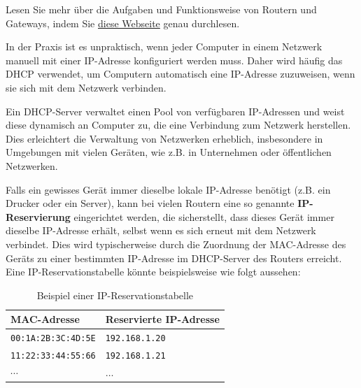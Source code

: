 \begin{mychallenge}
	Lesen Sie mehr über die Aufgaben und Funktionsweise von Routern und Gateways, indem Sie \href{https://inf-schule.de/rechnernetze/filius/vernetzungrechnernetze/konzept_router}{diese Webseite} genau durchlesen.
\end{mychallenge}


\begin{myremark}
	In der Praxis ist es unpraktisch, wenn jeder Computer in einem Netzwerk manuell mit einer \gls{IP}-Adresse konfiguriert werden muss. Daher wird häufig das \acrfull{DHCP} verwendet, um Computern automatisch eine \gls{IP}-Adresse zuzuweisen, wenn sie sich mit dem Netzwerk verbinden. 
	
	Ein \gls{DHCP}-Server verwaltet einen Pool von verfügbaren \gls{IP}-Adressen und weist diese dynamisch an Computer zu, die eine Verbindung zum Netzwerk herstellen. Dies erleichtert die Verwaltung von Netzwerken erheblich, insbesondere in Umgebungen mit vielen Geräten, wie z.B. in Unternehmen oder öffentlichen Netzwerken. 
\end{myremark}

\begin{myremark}\label{remark:ip-reservation}
	Falls ein gewisses Gerät immer dieselbe lokale \gls{IP}-Adresse benötigt (z.B. ein Drucker oder ein Server), kann bei vielen Routern eine so genannte \textbf{\gls{IP}-Reservierung} eingerichtet werden, die sicherstellt, dass dieses Gerät immer dieselbe \gls{IP}-Adresse erhält, selbst wenn es sich erneut mit dem Netzwerk verbindet. Dies wird typischerweise durch die Zuordnung der \gls{MAC}-Adresse des Geräts zu einer bestimmten \gls{IP}-Adresse im \gls{DHCP}-Server des Routers erreicht. Eine \gls{IP}-Reservationstabelle könnte beispielsweise wie folgt aussehen:
	\begin{table}[H]
		\centering
		\begin{tabular}{l|l}
			\textbf{\gls{MAC}-Adresse}        & \textbf{Reservierte \gls{IP}-Adresse} \\\midrule\midrule
			\texttt{00:1A:2B:3C:4D:5E}           & \texttt{192.168.1.20} \\\midrule
			\texttt{11:22:33:44:55:66}           & \texttt{192.168.1.21} \\\midrule
			$\cdots$					 & $\dots$       \\
		\end{tabular}
		\caption{Beispiel einer \gls{IP}-Reservationstabelle}
	\end{table}
\end{myremark}

